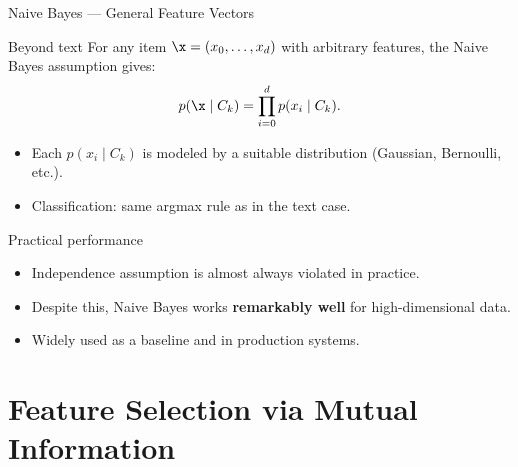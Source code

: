 \begin{frame}{Naive Bayes — General Feature Vectors}
  \begin{block}{Beyond text}
    For any item $\x=(x_0,\ldots,x_d)$ with arbitrary features, the Naive Bayes assumption gives:
    \[
      p(\x\mid C_k)=\prod_{i=0}^d p(x_i\mid C_k).
    \]
    \begin{itemize}
      \item Each $p(x_i\mid C_k)$ is modeled by a suitable distribution (Gaussian, Bernoulli, etc.).
      \item Classification: same argmax rule as in the text case.
    \end{itemize}
  \end{block}

  \begin{block}{Practical performance}
    \begin{itemize}
      \item Independence assumption is almost always violated in practice.
      \item Despite this, Naive Bayes works \textbf{remarkably well} for high-dimensional data.
      \item Widely used as a baseline and in production systems.
    \end{itemize}
  \end{block}
\end{frame}

\section{Feature Selection via Mutual Information}

